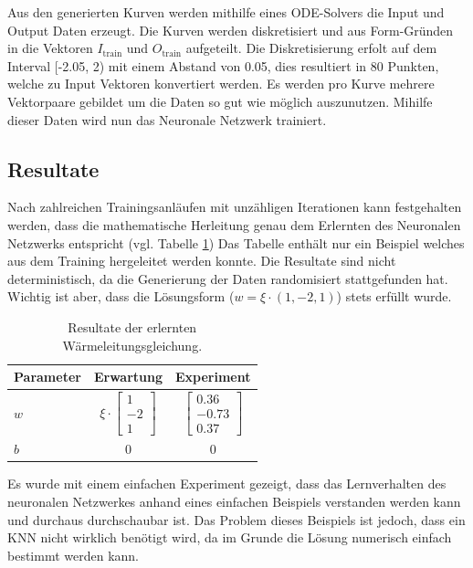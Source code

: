 Aus den generierten Kurven werden mithilfe eines ODE-Solvers die Input und Output Daten erzeugt. Die Kurven werden diskretisiert und aus Form-Gründen in die Vektoren $I_{\text{train}}$ und $O_{\text{train}}$ aufgeteilt. Die Diskretisierung erfolt auf dem Interval [-2.05, 2) mit einem Abstand von 0.05, dies resultiert in 80 Punkten, welche zu Input Vektoren konvertiert werden. Es werden pro Kurve mehrere Vektorpaare gebildet um die Daten so gut wie möglich auszunutzen. Mihilfe dieser Daten wird nun das Neuronale Netzwerk trainiert.

\subsection{Resultate}
Nach zahlreichen Trainingsanläufen mit unzähligen Iterationen kann festgehalten werden, dass die mathematische Herleitung genau dem Erlernten des Neuronalen Netzwerks entspricht (vgl. Tabelle \ref{tbl:result_heat}) Das Tabelle enthält nur ein Beispiel welches aus dem Training hergeleitet werden konnte. Die Resultate sind nicht deterministisch, da die Generierung der Daten randomisiert stattgefunden hat. Wichtig ist aber, dass die Lösungsform ($w = \xi \cdot (1, -2, 1)$) stets erfüllt wurde.

\begin{table}
	\centering
	\def\arraystretch{1.1}
	\begin{tabular}{l|c|c}
		Parameter & Erwartung & Experiment \\
		\hline
		$w$ & $\xi \cdot \begin{bmatrix} 1 \\ -2 \\ 1 \end{bmatrix}$ & $\begin{bmatrix} 0.36 \\ -0.73 \\ 0.37 \end{bmatrix}$ \\
		$b$ & 0 & 0 \\
	\end{tabular}
	\label{tbl:result_heat}
	\caption{Resultate der erlernten Wärmeleitungsgleichung.}
\end{table}

Es wurde mit einem einfachen Experiment gezeigt, dass das Lernverhalten des neuronalen Netzwerkes anhand eines einfachen Beispiels verstanden werden kann und durchaus durchschaubar ist. Das Problem dieses Beispiels ist jedoch, dass ein KNN nicht wirklich benötigt wird, da im Grunde die Lösung numerisch einfach bestimmt werden kann.